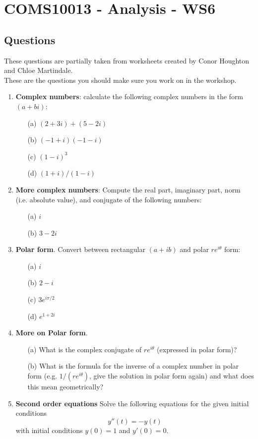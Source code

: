 \documentclass[11pt,a4paper]{scrartcl}
\begin{document}
\section*{COMS10013 - Analysis - WS6}

\subsection*{Questions}

These questions are partially taken from worksheets created by Conor Houghton and Chloe Martindale. \\

These are the questions you should make sure you work on in the workshop.

\begin{enumerate}
\item \textbf{Complex numbers}: calculate the following complex numbers in the form $(a+bi)$: 
	\begin{itemize}
		\item[(a)] $(2+3i) + (5-2i)$
		\item[(b)] $(-1+i)(-1-i)$
		\item[(c)] $(1-i)^3$
		\item[(d)] $(1+i)/(1-i)$
	\end{itemize}

	\item \textbf{More complex numbers}: Compute the real part, imaginary part, norm (i.e. absolute value), and conjugate of the following numbers:
	\begin{itemize}
		\item[(a)] $i$
		\item[(b)] $3-2i$
	\end{itemize}
	
	
	\item  \textbf{Polar form}. Convert between rectangular $(a+ib)$ and polar $re^{i\theta}$ form:
	\begin{itemize}
		\item[(a)] $i$
		\item[(b)] $2-i$
		\item[(c)] $3e^{i\pi/2}$
		\item[(d)] $e^{1+2i}$
	\end{itemize}


	\item  \textbf{More on Polar form}. 
	\begin{itemize}
		\item[(a)] What is the complex conjugate of $re^{i\theta}$ (expressed in polar form)?
		\item[(b)] What is the formula for the inverse of a complex number in polar form (e.g. $1/(re^{i\theta})$, give the
		solution in polar form again) and what does this mean geometrically?
	\end{itemize}
    
\item \textbf{Second order equations} Solve the following equations for the given initial conditions $$y''(t) = -y(t)$$ with initial conditions $y(0) = 1$ and $y'(0) = 0$.

\end{enumerate}
\end{document}
